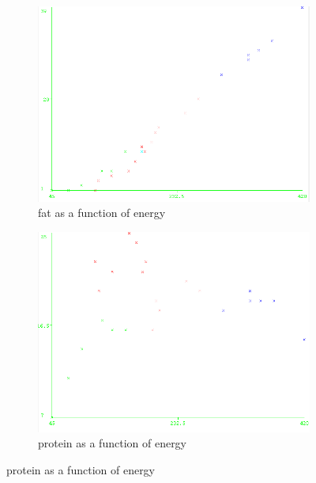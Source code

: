 \documentclass[letterpaper,12pt]{article}
\begin{document}
\begin{figure}[H]
\begin{subfigure}{.4\textwidth}
  \centering
  \includegraphics[width=.8\linewidth]{kmeans_seed10_5cl_energy_fat}  
  \caption{fat as a function of energy}
  \label{fig:sub-first_3}
\end{subfigure}
\begin{subfigure}{.4\textwidth}
  \centering
  \includegraphics[width=.8\linewidth]{kmeans_seed10_5cl_energy_protein}  
  \caption{protein as a function of energy}
  \label{fig:sub-second_3}
\end{subfigure}



\end{figure}
\end{document}
